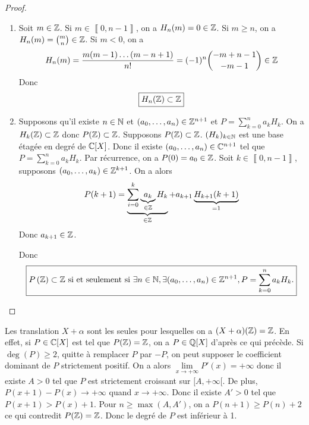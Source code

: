 \begin{proof}
	\phantom{}
	\begin{enumerate}
		\item Soit $m\in\mathbb{Z}$. Si $m\in\left\llbracket 0,n-1\right\rrbracket$, on a $H_{n}(m)=0\in\mathbb{Z}$.
		Si $m\geqslant n$, on a $H_{n}(m)=\binom{m}{n}\in\mathbb{Z}$. Si $m<0$, on a 
		\begin{equation}
			H_{n}(m)=\frac{m(m-1)\dots(m-n+1)}{n!}=(-1)^{n}\binom{-m+n-1}{-m-1}\in\mathbb{Z}
		\end{equation}
		Donc 
		\begin{equation}
			\boxed{H_{n}(\mathbb{Z})\subset\mathbb{Z}}
		\end{equation}

		\item Supposons qu'il existe $n\in\mathbb{N}$ et $(a_{0},\dots,a_{n})\in\mathbb{Z}^{n+1}$ et $P=\sum_{k=0}^{n}a_{k}H_{k}$. On a $H_{k}(\mathbb{Z})\subset\mathbb{Z}$ donc $P(\mathbb{Z})\subset\mathbb{Z}$.
		Supposons $P(\mathbb{Z})\subset\mathbb{Z}$. $(H_{k})_{k\in\mathbb{N}}$ est une base étagée en degré de $\mathbb{C}[X]$. Donc il existe $(a_{0},\dots,a_{n})\in\mathbb{C}^{n+1}$ tel que $P=\sum_{k=0}^{n}a_{k}H_{k}$. Par récurrence, on a $P(0)=a_{0}\in\mathbb{Z}$. Soit $k\in\left\llbracket 0,n-1\right\rrbracket$, supposons $(a_{0},\dots,a_{k})\in\mathbb{Z}^{k+1}$. On a alors 
		\begin{equation}
			P(k+1)=\underbrace{\sum_{i=0}^{k}\underbrace{a_{k}}_{\in\mathbb{Z}}H_{k}}_{\in\mathbb{Z}}+a_{k+1}\underbrace{H_{k+1}(k+1)}_{=1}
		\end{equation}
		Donc $a_{k+1}\in\mathbb{Z}$.

		Donc 
		\begin{equation}
			\boxed{P\left(\mathbb{Z}\right)\subset\mathbb{Z}\text{ si et seulement si }\exists n\in\mathbb{N},\exists(a_{0},\dots,a_{n})\in\mathbb{Z}^{n+1},P=\sum_{k=0}^{n}a_{k}H_{k}.}
		\end{equation}
	\end{enumerate}
\end{proof}

\begin{remark}
	Les translation $X+\alpha$ sont les seules pour lesquelles on a $(X+\alpha)(\mathbb{Z})=\mathbb{Z}$. En effet, si $P\in\mathbb{C}[X]$ est tel que $P(\mathbb{Z})=\mathbb{Z}$, on a $P\in\mathbb{Q}[X]$ d'après ce qui précède. Si $\deg(P)\geqslant2$, quitte à remplacer $P$ par $-P$, on peut supposer le coefficient dominant de $P$ strictement positif. On a alors $\lim\limits_{x\to+\infty}P'(x)=+\infty$ donc il existe $A>0$ tel que $P$ est strictement croissant sur $[A,+\infty[$. De plus, $P(x+1)-P(x)\to+\infty$ quand $x\to+\infty$. Donc il existe $A'>0$ tel que $P(x+1)>P(x)+1$. Pour $n\geqslant\max(A,A')$, on a $P(n+1)\geqslant P(n)+2$ ce qui contredit $P(\mathbb{Z})=\mathbb{Z}$. Donc le degré de $P$ est inférieur à 1.
\end{remark}

